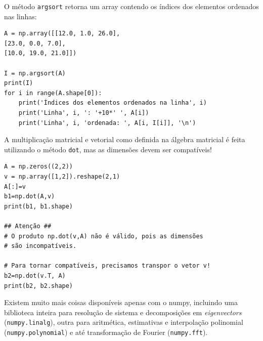 \documentclass[../numerical_methods.tex]{subfiles}
\begin{document}
O método \texttt{argsort} retorna um array contendo os índices dos elementos ordenados nas linhas:
\begin{verbatim}
A = np.array([[12.0, 1.0, 26.0],
[23.0, 0.0, 7.0],
[10.0, 19.0, 21.0]])

I = np.argsort(A)
print(I)
for i in range(A.shape[0]):
    print('Índices dos elementos ordenados na linha', i)
    print('Linha', i, ': '+10*' ', A[i])
    print('Linha', i, 'ordenada: ', A[i, I[i]], '\n')
\end{verbatim}
A multiplicação matricial e vetorial como definida na álgebra matricial é feita utilizando o método \texttt{dot}, mas as dimensões devem ser compatíveis!
\begin{verbatim}
A = np.zeros((2,2))
v = np.array([1,2]).reshape(2,1)
A[:]=v 
b1=np.dot(A,v)
print(b1, b1.shape)

## Atenção ## 
# O produto np.dot(v,A) não é válido, pois as dimensões 
# são incompatíveis.

# Para tornar compatíveis, precisamos transpor o vetor v! 
b2=np.dot(v.T, A)
print(b2, b2.shape)
\end{verbatim}

Existem muito mais coisas disponíveis apenas com o numpy, incluindo uma biblioteca inteira para resolução de sistema e decomposições em \textit{eigenvectors} (\texttt{numpy.linalg}), outra para aritmética, estimativas e interpolação polinomial (\texttt{numpy.polynomial}) e até transformação de Fourier (\texttt{numpy.fft}).
\end{document}
